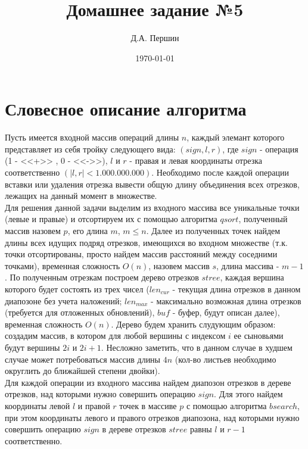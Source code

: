 \documentclass[12pt]{article}
\title{\bf Домашнее задание №5}
\author{Д.А. Першин}
\date{\today}
\begin{document}
\maketitle


\section{Словесное описание алгоритма}

Пусть имеется входной массив операций длины $n$, каждый элемант которого представляет из себя тройку следующего вида: $(sign,l,r)$, где $sign$ - операция (1 - <<+>> , 0 - <<->>), $l$ и $r$ - правая и левая координаты  отрезка соответственно $(|l,r|< 1.000.000.000)$. Необходимо после каждой операции вставки или удаления отрезка вывести общую длину объединения всех отрезков, лежащих на данный момент в множестве.\\

Для решения данной задачи выделим из входного массива все уникальные точки (левые и правые) и отсортируем их с помощью алгоритма $qsort$, полученный массив назовем $p$, его длина $m$, $m \leq n$. Далее из полученных точек найдем длины всех идущих подряд отрезков, имеющихся во входном множестве (т.к. точки отсортированы, просто найдем массив расстояний между соседними точками), временная сложность $O(n)$, назовем массив $s$, длина массива - $m-1$. По полученным отрезкам построем дерево отрезков $stree$, каждая вершина которого будет состоять из трех чисел ($len_{cur}$ - текущая длина отрезков в данном диапозоне без учета наложений; $len_{max}$ - максимально возможная длина отрезков (требуется для отложенных обновлений), $buf$ - буфер, будут описан далее), временная сложность $O(n)$. Дерево будем хранить слудующим образом: создадим массив, в котором для любой вершины с индексом $i$ ее сыновьями будут вершины $2i$ и $2i+1$. Несложно заметить, что в данном случае в худшем случае может потребоваться массив длины $4n$ (кол-во листьев необходимо округлить до ближайшей степени двойки).\\

Для каждой операции из входного массива найдем диапозон отрезков в дереве отрезков, над которыми нужно совершить операцию $sign$. Для этого найдем координаты левой $l$ и правой $r$ точек в массиве $p$ с помощью алгоритма $bsearch$, при этом координаты левого и правого отрезков диапозона, над которыми нужно совершить операцию $sign$ в дереве отрезков $stree$ равны  $l$ и $r-1$ соответственно.\\
\end{document}
